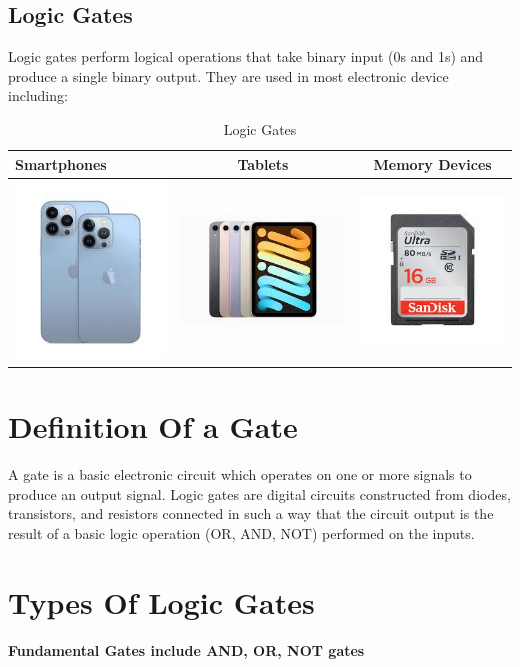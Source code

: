 \documentclass{article}
\begin{document}
	\subsection{Logic Gates}
		Logic gates perform logical operations that take binary input (0s and 1s) and produce a single binary output. They are used in most electronic device including:
	\begin{table}[h!]
		\begin{center}
			\caption{Logic Gates}
			\label{tab:table1}
			\begin{tabular}{l|c|c|}
				\hline
				Smartphones
				&
				Tablets
				&
				Memory Devices
				\\
				\hline
				\includegraphics[width=0.2\linewidth]{iphone13}
				&
				\includegraphics[width=0.25\linewidth]{ipadmini}
				&
				\includegraphics[width=0.2\linewidth]{download}
				\\
				\hline
			\end{tabular}
		\end{center}
	\end{table}
\newpage
\section{Definition Of a Gate}
A gate is a basic electronic circuit which operates on one or more signals to produce an output signal. 
Logic gates are digital circuits constructed from diodes, transistors, and resistors connected in such a way that the circuit output is the result of a basic logic operation (OR, AND, NOT) performed on the inputs. \cite{okoacha2021logic}
\section{Types Of Logic Gates}
\textbf{Fundamental Gates include AND, OR, NOT gates}
\end{document}

